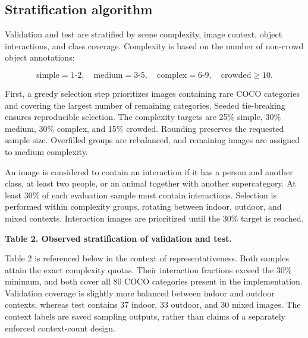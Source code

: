 \documentclass{article}
\begin{document}
\subsection{Stratification
algorithm}\label{stratification-algorithm}

Validation and test are stratified by scene complexity, image context,
object interactions, and class coverage. Complexity is based on the
number of non-crowd object annotations:

\[
\text{simple}=1\text{-}2,\quad
\text{medium}=3\text{-}5,\quad
\text{complex}=6\text{-}9,\quad
\text{crowded}\geq10.
\]

First, a greedy selection step prioritizes images containing rare COCO
categories and covering the largest number of remaining categories.
Seeded tie-breaking ensures reproducible selection. The complexity
targets are 25\% simple, 30\% medium, 30\% complex, and 15\% crowded.
Rounding preserves the requested sample size. Overfilled groups are
rebalanced, and remaining images are assigned to medium complexity.

An image is considered to contain an interaction if it has a person and
another class, at least two people, or an animal together with another
supercategory. At least 30\% of each evaluation sample must contain
interactions. Selection is performed within complexity groups, rotating
between indoor, outdoor, and mixed contexts. Interaction images are
prioritized until the 30\% target is reached.

\begin{center}
\textbf{Table 2. Observed stratification of validation and test.}
\end{center}

\begin{table}[htbp]
\centering
{}
\end{table}

Table 2 is referenced below in the context of representativeness. Both
samples attain the exact complexity quotas. Their interaction fractions
exceed the 30\% minimum, and both cover all 80 COCO categories present
in the implementation. Validation coverage is slightly more balanced
between indoor and outdoor contexts, whereas test contains 37 indoor, 33
outdoor, and 30 mixed images. The context labels are saved sampling
outputs, rather than claims of a separately enforced context-count
design.
\end{document}
